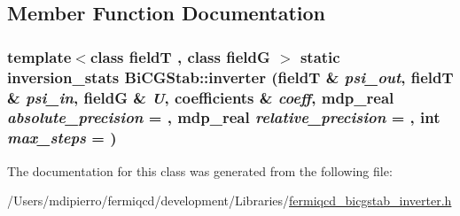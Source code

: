 \subsection{Member Function Documentation}
\hypertarget{class_bi_c_g_stab_a97cec9f05989420749ef3191c81ffa1c}{
\subsubsection[{inverter}]{\setlength{\rightskip}{0pt plus 5cm}template$<$class fieldT , class fieldG $>$ static {\bf inversion\_\-stats} BiCGStab::inverter (fieldT \& {\em psi\_\-out}, \/  fieldT \& {\em psi\_\-in}, \/  fieldG \& {\em U}, \/  {\bf coefficients} \& {\em coeff}, \/  {\bf mdp\_\-real} {\em absolute\_\-precision} = {}, \/  {\bf mdp\_\-real} {\em relative\_\-precision} = {}, \/  int {\em max\_\-steps} = {})}}
\label{class_bi_c_g_stab_a97cec9f05989420749ef3191c81ffa1c}


The documentation for this class was generated from the following file:\begin{DoxyCompactItemize}
\item 
/Users/mdipierro/fermiqcd/development/Libraries/\hyperlink{fermiqcd__bicgstab__inverter_8h}{fermiqcd\_\-bicgstab\_\-inverter.h}\end{DoxyCompactItemize}
